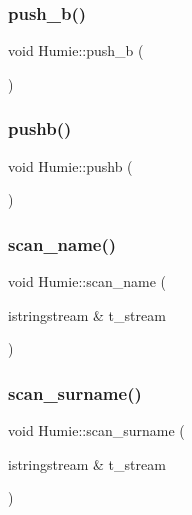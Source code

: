 \mbox{\label{class_humie_aa6368dac76b40953826412687225f90b}} 
\subsubsection{\texorpdfstring{push\_b()}{push\_b()}}
{\footnotesize\ttfamily void Humie\+::push\+\_\+b (\begin{DoxyParamCaption}{ }\end{DoxyParamCaption})\hspace{0.3cm}{\ttfamily [inline]}}

\mbox{\label{class_humie_a17c1f72bb259eaad9df23f01c8502e00}} 
\subsubsection{\texorpdfstring{pushb()}{pushb()}}
{\footnotesize\ttfamily void Humie\+::pushb (\begin{DoxyParamCaption}{ }\end{DoxyParamCaption})\hspace{0.3cm}{\ttfamily [inline]}}

\mbox{\label{class_humie_a5552bf054c13cafd3e921b7de259b2d9}} 
\subsubsection{\texorpdfstring{scan\_name()}{scan\_name()}}
{\footnotesize\ttfamily void Humie\+::scan\+\_\+name (\begin{DoxyParamCaption}\item[{istringstream \&}]{t\+\_\+stream }\end{DoxyParamCaption})}

\mbox{\label{class_humie_a98ca5452603ec476e06c6e73fd4007bb}} 
\subsubsection{\texorpdfstring{scan\_surname()}{scan\_surname()}}
{\footnotesize\ttfamily void Humie\+::scan\+\_\+surname (\begin{DoxyParamCaption}\item[{istringstream \&}]{t\+\_\+stream }\end{DoxyParamCaption})}

